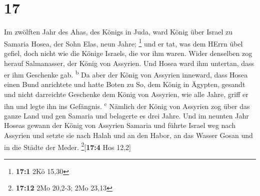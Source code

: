 \hypertarget{section-16}{%
\section{17}\label{section-16}}

 Im zwölften Jahr des Ahas, des Königs in Juda, ward König
über Israel zu Samaria Hosea, der Sohn Elas, neun Jahre; \footnote{\textbf{17:1}
  2Kö 15,30}  und er tat, was dem HErrn übel gefiel, doch
nicht wie die Könige Israels, die vor ihm waren.  Wider
denselben zog herauf Salmanasser, der König von Assyrien. Und Hosea ward
ihm untertan, dass er ihm Geschenke gab. \textsuperscript{b}
 Da aber der König von Assyrien inneward, dass Hosea einen
Bund anrichtete und hatte Boten zu So, dem König in Ägypten, gesandt und
nicht darreichte Geschenke dem König von Assyrien, wie alle Jahre, griff
er ihn und legte ihn ins Gefängnis. \textsuperscript{c} 
Nämlich der König von Assyrien zog über das ganze Land und gen Samaria
und belagerte es drei Jahre.  Und im neunten Jahr Hoseas
gewann der König von Assyrien Samaria und führte Israel weg nach
Assyrien und setzte sie nach Halah und an den Habor, an das Wasser Gosan
und in die Städte der Meder. \footnote{\textbf{17:12} 2Mo 20,2-3; 2Mo
  23,13}{[}\textbf{17:4} Hos 12,2{]}

